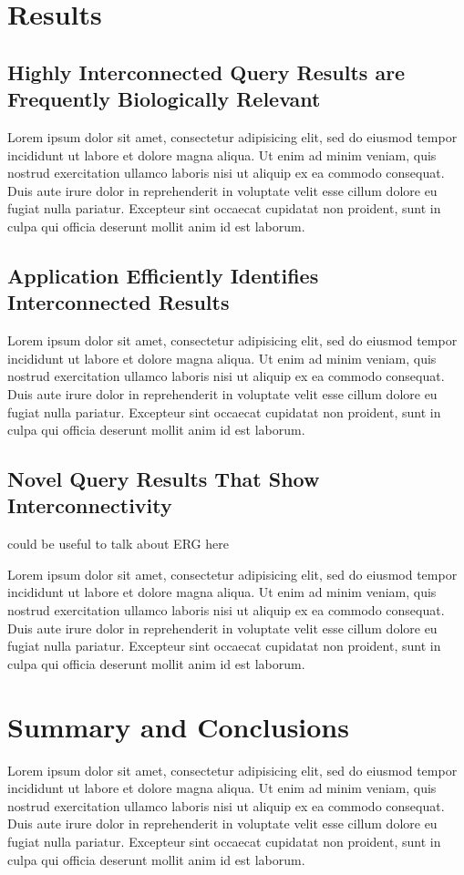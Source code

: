 \documentclass[12pt]{article}
\begin{document}
\section{Results}

\subsection{Highly Interconnected Query Results are Frequently Biologically Relevant}
Lorem ipsum dolor sit amet, consectetur adipisicing elit, sed do eiusmod tempor incididunt ut labore et dolore magna aliqua. Ut enim ad minim veniam, quis nostrud exercitation ullamco laboris nisi ut aliquip ex ea commodo consequat. Duis aute irure dolor in reprehenderit in voluptate velit esse cillum dolore eu fugiat nulla pariatur. Excepteur sint occaecat cupidatat non proident, sunt in culpa qui officia deserunt mollit anim id est laborum.

\subsection{Application Efficiently Identifies Interconnected Results}
Lorem ipsum dolor sit amet, consectetur adipisicing elit, sed do eiusmod tempor incididunt ut labore et dolore magna aliqua. Ut enim ad minim veniam, quis nostrud exercitation ullamco laboris nisi ut aliquip ex ea commodo consequat. Duis aute irure dolor in reprehenderit in voluptate velit esse cillum dolore eu fugiat nulla pariatur. Excepteur sint occaecat cupidatat non proident, sunt in culpa qui officia deserunt mollit anim id est laborum.

\subsection{Novel Query Results That Show Interconnectivity}
could be useful to talk about ERG here

Lorem ipsum dolor sit amet, consectetur adipisicing elit, sed do eiusmod tempor incididunt ut labore et dolore magna aliqua. Ut enim ad minim veniam, quis nostrud exercitation ullamco laboris nisi ut aliquip ex ea commodo consequat. Duis aute irure dolor in reprehenderit in voluptate velit esse cillum dolore eu fugiat nulla pariatur. Excepteur sint occaecat cupidatat non proident, sunt in culpa qui officia deserunt mollit anim id est laborum.



\section{Summary and Conclusions}
Lorem ipsum dolor sit amet, consectetur adipisicing elit, sed do eiusmod tempor incididunt ut labore et dolore magna aliqua. Ut enim ad minim veniam, quis nostrud exercitation ullamco laboris nisi ut aliquip ex ea commodo consequat. Duis aute irure dolor in reprehenderit in voluptate velit esse cillum dolore eu fugiat nulla pariatur. Excepteur sint occaecat cupidatat non proident, sunt in culpa qui officia deserunt mollit anim id est laborum.
\end{document}
